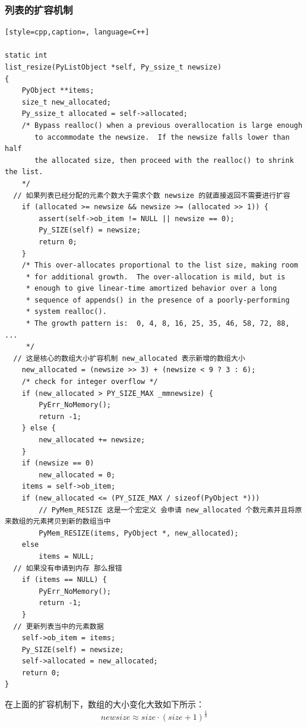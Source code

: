 \subsubsection{列表的扩容机制}
\begin{lstlisting}[style=cpp,caption=, language=C++]

static int
list_resize(PyListObject *self, Py_ssize_t newsize)
{
    PyObject **items;
    size_t new_allocated;
    Py_ssize_t allocated = self->allocated;
    /* Bypass realloc() when a previous overallocation is large enough
       to accommodate the newsize.  If the newsize falls lower than half
       the allocated size, then proceed with the realloc() to shrink the list.
    */
  // 如果列表已经分配的元素个数大于需求个数 newsize 的就直接返回不需要进行扩容
    if (allocated >= newsize && newsize >= (allocated >> 1)) {
        assert(self->ob_item != NULL || newsize == 0);
        Py_SIZE(self) = newsize;
        return 0;
    }
    /* This over-allocates proportional to the list size, making room
     * for additional growth.  The over-allocation is mild, but is
     * enough to give linear-time amortized behavior over a long
     * sequence of appends() in the presence of a poorly-performing
     * system realloc().
     * The growth pattern is:  0, 4, 8, 16, 25, 35, 46, 58, 72, 88, ...
     */
  // 这是核心的数组大小扩容机制 new_allocated 表示新增的数组大小
    new_allocated = (newsize >> 3) + (newsize < 9 ? 3 : 6);
    /* check for integer overflow */
    if (new_allocated > PY_SIZE_MAX _mmnewsize) { 
        PyErr_NoMemory();
        return -1;
    } else {
        new_allocated += newsize;
    }
    if (newsize == 0)
        new_allocated = 0;
    items = self->ob_item;
    if (new_allocated <= (PY_SIZE_MAX / sizeof(PyObject *)))
      	// PyMem_RESIZE 这是一个宏定义 会申请 new_allocated 个数元素并且将原来数组的元素拷贝到新的数组当中
        PyMem_RESIZE(items, PyObject *, new_allocated);
    else
        items = NULL;
  // 如果没有申请到内存 那么报错
    if (items == NULL) {
        PyErr_NoMemory();
        return -1;
    }
  // 更新列表当中的元素数据
    self->ob_item = items;
    Py_SIZE(self) = newsize;
    self->allocated = new_allocated;
    return 0;
}
\end{lstlisting}
在上面的扩容机制下，数组的大小变化大致如下所示：
$$
newsize \approx size \cdot (size + 1)^{\frac{1}{8}}
$$

